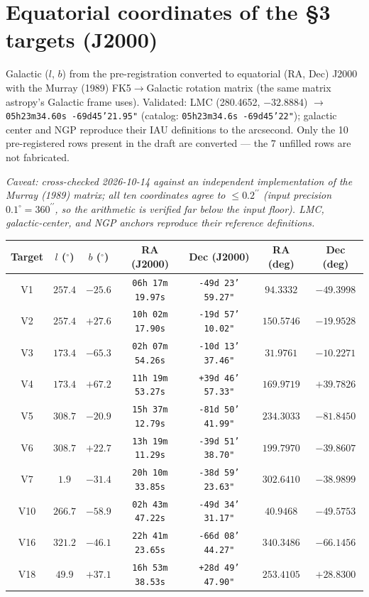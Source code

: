 \documentclass{alienfolio}
\begin{document}
\section{Equatorial coordinates of the \S3 targets (J2000)}
\label{app:coords}

{\sloppy
Galactic ($l$, $b$) from the pre-registration converted to equatorial (RA, Dec)
J2000 with the Murray (1989) FK5$\to$Galactic rotation matrix (the same
matrix astropy's Galactic frame uses). Validated: LMC (280.4652,
$-32.8884$) $\to$ \texttt{05h23m34.60s -69d45'21.95"} (catalog:
\texttt{05h23m34.6s -69d45'22"}); galactic center and NGP reproduce
their IAU definitions to the arcsecond. Only the 10 pre-registered rows present
in the draft are converted --- the 7 unfilled rows are not fabricated.
\par}

\emph{Caveat: cross-checked 2026-10-14 against an independent
implementation of the Murray (1989) matrix; all ten coordinates agree to
$\le 0.2^{\prime\prime}$ (input precision $0.1^\circ =
360^{\prime\prime}$, so the arithmetic is verified far below the input
floor). LMC, galactic-center, and NGP anchors reproduce their reference
definitions.}

\begin{center}
\small
\begin{tabular}{c|c|c|c|c|c|c}
Target & $l$ ($^\circ$) & $b$ ($^\circ$) & RA (J2000) & Dec (J2000) & RA (deg) & Dec (deg) \\ \hline
V1 & $257.4$ & $-25.6$ & \texttt{06h 17m 19.97s} & \texttt{-49d 23' 59.27"} & $94.3332$ & $-49.3998$ \\
V2 & $257.4$ & $+27.6$ & \texttt{10h 02m 17.90s} & \texttt{-19d 57' 10.02"} & $150.5746$ & $-19.9528$ \\
V3 & $173.4$ & $-65.3$ & \texttt{02h 07m 54.26s} & \texttt{-10d 13' 37.46"} & $31.9761$ & $-10.2271$ \\
V4 & $173.4$ & $+67.2$ & \texttt{11h 19m 53.27s} & \texttt{+39d 46' 57.33"} & $169.9719$ & $+39.7826$ \\
V5 & $308.7$ & $-20.9$ & \texttt{15h 37m 12.79s} & \texttt{-81d 50' 41.99"} & $234.3033$ & $-81.8450$ \\
V6 & $308.7$ & $+22.7$ & \texttt{13h 19m 11.29s} & \texttt{-39d 51' 38.70"} & $199.7970$ & $-39.8607$ \\
V7 & $1.9$ & $-31.4$ & \texttt{20h 10m 33.85s} & \texttt{-38d 59' 23.63"} & $302.6410$ & $-38.9899$ \\
V10 & $266.7$ & $-58.9$ & \texttt{02h 43m 47.22s} & \texttt{-49d 34' 31.17"} & $40.9468$ & $-49.5753$ \\
V16 & $321.2$ & $-46.1$ & \texttt{22h 41m 23.65s} & \texttt{-66d 08' 44.27"} & $340.3486$ & $-66.1456$ \\
V18 & $49.9$ & $+37.1$ & \texttt{16h 53m 38.53s} & \texttt{+28d 49' 47.90"} & $253.4105$ & $+28.8300$ \\
\end{tabular}
\end{center}
\end{document}
